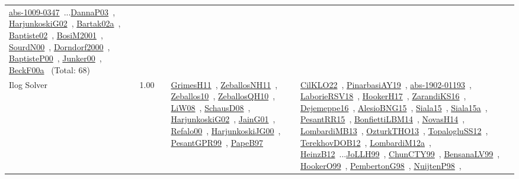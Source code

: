 {\begin{longtable}{p{3cm}r>{\raggedright\arraybackslash}p{6cm}>{\raggedright\arraybackslash}p{6cm}>{\raggedright\arraybackslash}p{8cm}}
\href{../works/abs-1009-0347.pdf}{abs-1009-0347}~\cite{abs-1009-0347}...\href{../works/DannaP03.pdf}{DannaP03}~\cite{DannaP03}, \href{../works/HarjunkoskiG02.pdf}{HarjunkoskiG02}~\cite{HarjunkoskiG02}, \href{../works/Bartak02a.pdf}{Bartak02a}~\cite{Bartak02a}, \href{../works/Baptiste02.pdf}{Baptiste02}~\cite{Baptiste02}, \href{../works/BosiM2001.pdf}{BosiM2001}~\cite{BosiM2001}, \href{../works/SourdN00.pdf}{SourdN00}~\cite{SourdN00}, \href{../works/Dorndorf2000.pdf}{Dorndorf2000}~\cite{Dorndorf2000}, \href{../works/BaptisteP00.pdf}{BaptisteP00}~\cite{BaptisteP00}, \href{../works/Junker00.pdf}{Junker00}~\cite{Junker00}, \href{../works/BeckF00a.pdf}{BeckF00a}~\cite{BeckF00a} (Total: 68)\\
\index{Ilog Solver}\index{CPSystems!Ilog Solver}Ilog Solver &  1.00 &  & \href{../works/GrimesH11.pdf}{GrimesH11}~\cite{GrimesH11}, \href{../works/ZeballosNH11.pdf}{ZeballosNH11}~\cite{ZeballosNH11}, \href{../works/Zeballos10.pdf}{Zeballos10}~\cite{Zeballos10}, \href{../works/ZeballosQH10.pdf}{ZeballosQH10}~\cite{ZeballosQH10}, \href{../works/LiW08.pdf}{LiW08}~\cite{LiW08}, \href{../works/SchausD08.pdf}{SchausD08}~\cite{SchausD08}, \href{../works/HarjunkoskiG02.pdf}{HarjunkoskiG02}~\cite{HarjunkoskiG02}, \href{../works/JainG01.pdf}{JainG01}~\cite{JainG01}, \href{../works/Refalo00.pdf}{Refalo00}~\cite{Refalo00}, \href{../works/HarjunkoskiJG00.pdf}{HarjunkoskiJG00}~\cite{HarjunkoskiJG00}, \href{../works/PesantGPR99.pdf}{PesantGPR99}~\cite{PesantGPR99}, \href{../works/PapeB97.pdf}{PapeB97}~\cite{PapeB97} & \href{../works/CilKLO22.pdf}{CilKLO22}~\cite{CilKLO22}, \href{../works/PinarbasiAY19.pdf}{PinarbasiAY19}~\cite{PinarbasiAY19}, \href{../works/abs-1902-01193.pdf}{abs-1902-01193}~\cite{abs-1902-01193}, \href{../works/LaborieRSV18.pdf}{LaborieRSV18}~\cite{LaborieRSV18}, \href{../works/HookerH17.pdf}{HookerH17}~\cite{HookerH17}, \href{../works/ZarandiKS16.pdf}{ZarandiKS16}~\cite{ZarandiKS16}, \href{../works/Dejemeppe16.pdf}{Dejemeppe16}~\cite{Dejemeppe16}, \href{../works/AlesioBNG15.pdf}{AlesioBNG15}~\cite{AlesioBNG15}, \href{../works/Siala15.pdf}{Siala15}~\cite{Siala15}, \href{../works/Siala15a.pdf}{Siala15a}~\cite{Siala15a}, \href{../works/PesantRR15.pdf}{PesantRR15}~\cite{PesantRR15}, \href{../works/BonfiettiLBM14.pdf}{BonfiettiLBM14}~\cite{BonfiettiLBM14}, \href{../works/NovasH14.pdf}{NovasH14}~\cite{NovasH14}, \href{../works/LombardiMB13.pdf}{LombardiMB13}~\cite{LombardiMB13}, \href{../works/OzturkTHO13.pdf}{OzturkTHO13}~\cite{OzturkTHO13}, \href{../works/TopalogluSS12.pdf}{TopalogluSS12}~\cite{TopalogluSS12}, \href{../works/TerekhovDOB12.pdf}{TerekhovDOB12}~\cite{TerekhovDOB12}, \href{../works/LombardiM12a.pdf}{LombardiM12a}~\cite{LombardiM12a}, \href{../works/HeinzB12.pdf}{HeinzB12}~\cite{HeinzB12}...\href{../works/JoLLH99.pdf}{JoLLH99}~\cite{JoLLH99}, \href{../works/ChunCTY99.pdf}{ChunCTY99}~\cite{ChunCTY99}, \href{../works/BensanaLV99.pdf}{BensanaLV99}~\cite{BensanaLV99}, \href{../works/HookerO99.pdf}{HookerO99}~\cite{HookerO99}, \href{../works/PembertonG98.pdf}{PembertonG98}~\cite{PembertonG98}, \href{../works/NuijtenP98.pdf}{NuijtenP98}~\cite{NuijtenP98}, 
\end{longtable}}

